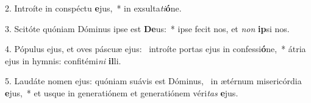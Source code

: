 2. Introíte in conspéctu \textbf{e}jus,~*  in exsulta\textit{ti}\textbf{ó}ne.\

3. Scitóte quóniam Dóminus ipse est \textbf{De}us:~*  ipse fecit nos, et \textit{non} \textbf{ip}si nos.\

4. Pópulus ejus, et oves páscuæ ejus: \dag\  introíte portas ejus in confessi\textbf{ó}ne,~*  átria ejus in hymnis: confitémi\textit{ni} \textbf{il}li.\

5. Laudáte nomen ejus: quóniam suávis est Dóminus, \dag\  in ætérnum misericórdia \textbf{e}jus,~*  et usque in generatiónem et generatiónem véri\textit{tas} \textbf{e}jus.\

